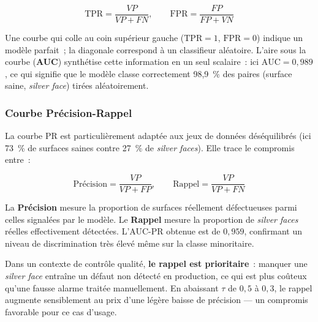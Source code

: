 \begin{equation}
    \text{TPR} = \frac{VP}{VP + FN}, \qquad \text{FPR} = \frac{FP}{FP + VN}
    \label{eq:tpr-fpr}
\end{equation}

Une courbe qui colle au coin supérieur gauche ($\text{TPR} = 1$, $\text{FPR} = 0$) indique un modèle parfait~; la diagonale correspond à un classifieur aléatoire. L'aire sous la courbe (\textbf{AUC}) synthétise cette information en un seul scalaire~: ici $\text{AUC} = 0{,}989$, ce qui signifie que le modèle classe correctement 98{,}9~\% des paires (surface saine, \textit{silver face}) tirées aléatoirement.

\subsubsection{Courbe Précision-Rappel}

La courbe PR est particulièrement adaptée aux jeux de données déséquilibrés (ici 73~\% de surfaces saines contre 27~\% de \textit{silver faces}). Elle trace le compromis entre~:

\begin{equation}
    \text{Précision} = \frac{VP}{VP + FP}, \qquad \text{Rappel} = \frac{VP}{VP + FN}
    \label{eq:precision-rappel}
\end{equation}

La \textbf{Précision} mesure la proportion de surfaces réellement défectueuses parmi celles signalées par le modèle. Le \textbf{Rappel} mesure la proportion de \textit{silver faces} réelles effectivement détectées. L'AUC-PR obtenue est de $0{,}959$, confirmant un niveau de discrimination très élevé même sur la classe minoritaire.

Dans un contexte de contrôle qualité, \textbf{le rappel est prioritaire}~: manquer une \textit{silver face} entraîne un défaut non détecté en production, ce qui est plus coûteux qu'une fausse alarme traitée manuellement. En abaissant $\tau$ de $0{,}5$ à $0{,}3$, le rappel augmente sensiblement au prix d'une légère baisse de précision — un compromis favorable pour ce cas d'usage.

